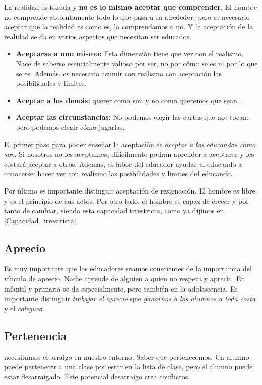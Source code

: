 \documentclass[palatino]{apuntesURJC}
\begin{document}
	La realidad es tozuda y \textbf{no es lo mismo aceptar que comprender}. 
	El hombre no comprende absolutamente todo lo que pasa a su alrededor, pero es necesario aceptar que la realidad es como es, la comprendamos o no.
	Y la aceptación de la realidad se da en varios aspectos que necesitan ser educados.

	\begin{itemize}
		\item \textbf{Aceptarse a uno mismo:} Esta dimensión tiene que ver con el realismo. 
		Nace de saberse esencialmente valioso por ser, no por cómo se es ni por lo que se es.
		Además, es necesario asumir con realismo con aceptación las posibilidades y límites.

		\item \textbf{Aceptar a los demás:} querer como son y no como queremos que sean.

		\item \textbf{Aceptar las circunstancias:} No podemos elegir las cartas que nos tocan, pero podemos elegir cómo jugarlas.
	\end{itemize}

	El primer paso para poder enseñar la aceptación es \textit{aceptar a los educandos como son}.
	Si nosotros no les aceptamos, difícilmente podrán aprender a aceptarse y les costará aceptar a otros.
	Además, es labor del educador ayudar al educando a conocerse: hacer ver con realismo las posibilidades y límites del educando. 

	Por último es importante distinguir aceptación de resignación. El hombre es libre y es el principio de sus actos.
	Por otro lado, el hombre es capaz de crecer y por tanto de cambiar, siendo esta capacidad irrestricta, como ya dijimos en \ref{Capacidad_irrestricta}.
	


	\subsection{Aprecio}

Es muy importante que los educadores seamos conscientes de la importancia del vínculo de aprecio. 
%
Nadie aprende de alguien a quien no respeta y aprecia. 
%
En infantil y primaria se da especialmente, pero también en la adolescencia.
%
Es importante distinguir \textit{trabajar el aprecio} que \textit{ganarnos a los alumnos a toda costa} y el \textit{colegueo}.

	\subsection{Pertenencia} necesitamos el arraigo en nuestro entorno. Saber que pertenecemos. 
%
Un alumno puede pertenecer a una clase por estar en la lista de clase, pero el alumno puede estar desarraigado. 
%
Este potencial desarraigo crea conflictos.
\end{document}
